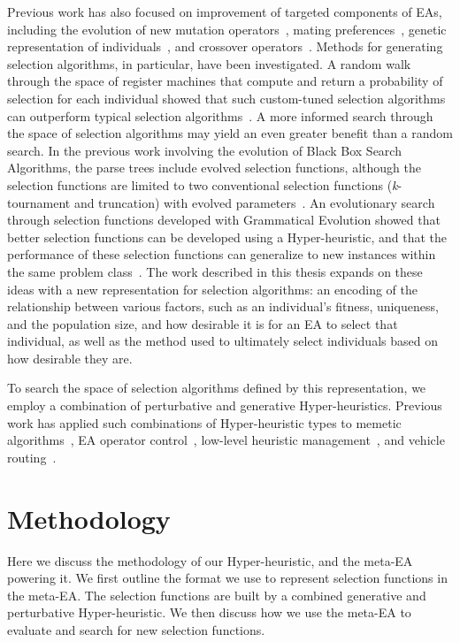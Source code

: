 \documentclass[sigconf]{acmart}
\begin{document}
Previous work has also focused on improvement of targeted components of EAs, including the evolution of new mutation operators~\citep{woodward2012mutationGeneration, hong2013probMutation}, mating preferences~\citep{guntly2011limp}, genetic representation of individuals~\citep{scott2015geneticRepresentations}, and crossover operators~\citep{goldman2011scc}. Methods for generating selection algorithms, in particular, have been investigated. A random walk through the space of register machines that compute and return a probability of selection for each individual showed that such custom-tuned selection algorithms can outperform typical selection algorithms~\citep{woodward2011selection}. A more informed search through the space of selection algorithms may yield an even greater benefit than a random search. In the previous work involving the evolution of Black Box Search Algorithms, the parse trees include evolved selection functions, although the selection functions are limited to two conventional selection functions (\textit{k}-tournament and truncation) with evolved parameters~\citep{martin2013evolvingBBSA}. An evolutionary search through selection functions developed with Grammatical Evolution showed that better selection functions can be developed using a Hyper-heuristic, and that the performance of these selection functions can generalize to new instances within the same problem class~\citep{lourencco2013selection}. The work described in this thesis expands on these ideas with a new representation for selection algorithms: an encoding of the relationship between various factors, such as an individual's fitness, uniqueness, and the population size, and how desirable it is for an EA to select that individual, as well as the method used to ultimately select individuals based on how desirable they are. 

To search the space of selection algorithms defined by this representation, we employ a combination of perturbative and generative Hyper-heuristics. Previous work has applied such combinations of Hyper-heuristic types to memetic algorithms~\citep{krasnogor2004memetic}, EA operator control~\citep{maturana2010autonomous}, low-level heuristic management~\citep{remde2012empirical}, and vehicle routing~\citep{garrido2010vehicleRouting}. 

\section{Methodology}
\label{Methodology}

Here we discuss the methodology of our Hyper-heuristic, and the meta-EA powering it. We first outline the format we use to represent selection functions in the meta-EA. The selection functions are built by a combined generative and perturbative Hyper-heuristic. We then discuss how we use the meta-EA to evaluate and search for new selection functions. 
\end{document}
